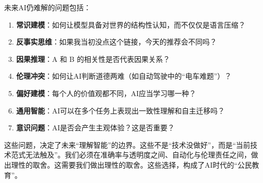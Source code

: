 未来AI仍难解的问题包括：

\begin{enumerate}
\item \textbf{常识建模}：如何让模型具备对世界的结构性认知，而不仅仅是语言压缩？
\item \textbf{反事实思维}：如果我当初没点这个链接，今天的推荐会不同吗？
\item \textbf{因果推理}：A 和 B 的相关性是否代表因果关系？
\item \textbf{伦理冲突}：如何让AI判断道德两难（如自动驾驶中的“电车难题”）？
\item \textbf{偏好建模}：每个人的价值观都不同，AI应当学习哪一种？
\item \textbf{通用智能}：AI可以在多个任务上表现出一致性理解和自主迁移吗？
\item \textbf{意识问题}：AI是否会产生主观体验？这是否重要？
\end{enumerate}

这些问题，决定了未来“理解智能”的边界。这些不是“技术没做好”，而是“当前技术范式无法触及”。我们必须在准确率与透明度之间、自动化与伦理责任之间，做出理性的取舍。这需要我们做出理性的取舍。这些选择，构成了AI时代的“公民教育”。


\nocite{*}
\printbibliography[heading=bibintoc, title=\ebibname]

\newpage



